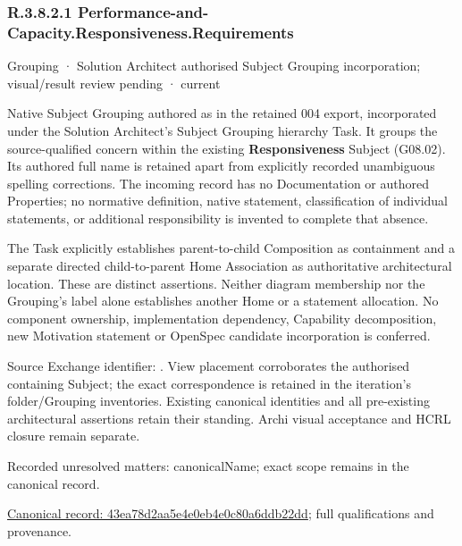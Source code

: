 \subsubsection*{R.3.8.2.1 Performance-and-Capacity.Responsiveness.Requirements}
\label{navigation:R.3.8.2.1}

\label{element:43ea78d2aa5e4e0eb4e0c80a6ddb22dd}
{\small Grouping · Solution Architect authorised Subject Grouping incorporation; visual/result review pending · current}\par

Native Subject Grouping authored as \texttt{} in the retained 004 export,
incorporated under the Solution Architect's Subject Grouping hierarchy Task.
It groups the source-qualified \texttt{} concern within
the existing \textbf{Responsiveness} Subject (G08.02). Its authored full name
is retained apart from explicitly recorded unambiguous spelling corrections.
The incoming record has no Documentation or authored Properties; no normative
definition, native statement, classification of individual statements, or
additional responsibility is invented to complete that absence.



The Task explicitly establishes parent-to-child Composition as containment and
a separate directed child-to-parent Home Association as authoritative architectural
location. These are distinct assertions. Neither diagram membership nor the
Grouping's label alone establishes another Home or a statement allocation.
No component ownership, implementation dependency, Capability decomposition,
new Motivation statement or OpenSpec candidate incorporation is conferred.



Source Exchange identifier: \texttt{}. View placement corroborates
the authorised containing Subject; the exact correspondence is retained in the
iteration's folder/Grouping inventories. Existing canonical identities and all
pre-existing architectural assertions retain their standing. Archi visual
acceptance and HCRL closure remain separate.


{\small Recorded unresolved matters: canonicalName; exact scope remains in the canonical record.}\par
{\footnotesize \href{../../../../continuum/grouping/43ea78d2aa5e4e0eb4e0c80a6ddb22dd.md}{Canonical record: 43ea78d2aa5e4e0eb4e0c80a6ddb22dd}; full qualifications and provenance.}\par
